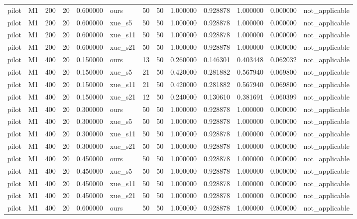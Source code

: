 \begin{longtable}{llrrrlrrrrrrl}
pilot & M1 & 200 & 20 & 0.600000 & ours & 50 & 50 & 1.000000 & 0.928878 & 1.000000 & 0.000000 & not\_applicable \\
pilot & M1 & 200 & 20 & 0.600000 & xue\_s5 & 50 & 50 & 1.000000 & 0.928878 & 1.000000 & 0.000000 & not\_applicable \\
pilot & M1 & 200 & 20 & 0.600000 & xue\_s11 & 50 & 50 & 1.000000 & 0.928878 & 1.000000 & 0.000000 & not\_applicable \\
pilot & M1 & 200 & 20 & 0.600000 & xue\_s21 & 50 & 50 & 1.000000 & 0.928878 & 1.000000 & 0.000000 & not\_applicable \\
pilot & M1 & 400 & 20 & 0.150000 & ours & 13 & 50 & 0.260000 & 0.146301 & 0.403448 & 0.062032 & not\_applicable \\
pilot & M1 & 400 & 20 & 0.150000 & xue\_s5 & 21 & 50 & 0.420000 & 0.281882 & 0.567940 & 0.069800 & not\_applicable \\
pilot & M1 & 400 & 20 & 0.150000 & xue\_s11 & 21 & 50 & 0.420000 & 0.281882 & 0.567940 & 0.069800 & not\_applicable \\
pilot & M1 & 400 & 20 & 0.150000 & xue\_s21 & 12 & 50 & 0.240000 & 0.130610 & 0.381691 & 0.060399 & not\_applicable \\
pilot & M1 & 400 & 20 & 0.300000 & ours & 50 & 50 & 1.000000 & 0.928878 & 1.000000 & 0.000000 & not\_applicable \\
pilot & M1 & 400 & 20 & 0.300000 & xue\_s5 & 50 & 50 & 1.000000 & 0.928878 & 1.000000 & 0.000000 & not\_applicable \\
pilot & M1 & 400 & 20 & 0.300000 & xue\_s11 & 50 & 50 & 1.000000 & 0.928878 & 1.000000 & 0.000000 & not\_applicable \\
pilot & M1 & 400 & 20 & 0.300000 & xue\_s21 & 50 & 50 & 1.000000 & 0.928878 & 1.000000 & 0.000000 & not\_applicable \\
pilot & M1 & 400 & 20 & 0.450000 & ours & 50 & 50 & 1.000000 & 0.928878 & 1.000000 & 0.000000 & not\_applicable \\
pilot & M1 & 400 & 20 & 0.450000 & xue\_s5 & 50 & 50 & 1.000000 & 0.928878 & 1.000000 & 0.000000 & not\_applicable \\
pilot & M1 & 400 & 20 & 0.450000 & xue\_s11 & 50 & 50 & 1.000000 & 0.928878 & 1.000000 & 0.000000 & not\_applicable \\
pilot & M1 & 400 & 20 & 0.450000 & xue\_s21 & 50 & 50 & 1.000000 & 0.928878 & 1.000000 & 0.000000 & not\_applicable \\
pilot & M1 & 400 & 20 & 0.600000 & ours & 50 & 50 & 1.000000 & 0.928878 & 1.000000 & 0.000000 & not\_applicable \\

\end{longtable}
